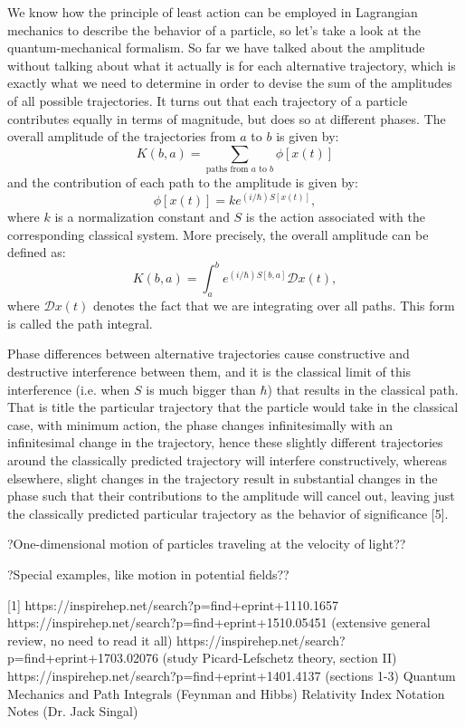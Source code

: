 \documentclass{emulateapj}
\begin{document}
We know how the principle of least action can be employed in Lagrangian mechanics to describe the behavior of a particle, so let's take a look at the quantum-mechanical formalism. So far we have talked about the amplitude without talking about what it actually is for each alternative trajectory, which is exactly what we need to determine in order to devise the sum of the amplitudes of all possible trajectories. It turns out that each trajectory of a particle contributes equally in terms of magnitude, but does so at different phases. The overall amplitude of the trajectories from $a$ to $b$ is given by:
\[ K(b,a) = \sum_{\text{paths from $a$ to $b$}} \phi [x(t)] \]
and the contribution of each path to the amplitude is given by:
\[ \phi [x(t)] = k e^{(i/\hbar)S[x(t)]}, \]
where $k$ is a normalization constant and $S$ is the action associated with the corresponding classical system. More precisely, the overall amplitude can be defined as:
\[ K(b,a) = \int_{a}^{b} e^{(i/\hbar)S[b, a]} \mathcal{D}x(t), \]
where $\mathcal{D}x(t)$ denotes the fact that we are integrating over all paths. This form is called the path integral.

Phase differences between alternative trajectories cause constructive and destructive interference between them, and it is the classical limit of this interference (i.e. when $S$ is much bigger than $\hbar$) that results in the classical path. That is title the particular trajectory that the particle would take in the classical case, with minimum action, the phase changes infinitesimally with an infinitesimal change in the trajectory, hence these slightly different trajectories around the classically predicted trajectory will interfere constructively, whereas elsewhere, slight changes in the trajectory result in substantial changes in the phase such that their contributions to the amplitude will cancel out, leaving just the classically predicted particular trajectory as the behavior of significance [5].

?One-dimensional motion of particles traveling at the velocity of light??

?Special examples, like motion in potential fields??


\begin{thebibliography}{}

[1] https://inspirehep.net/search?p=find+eprint+1110.1657 \newline
[2] https://inspirehep.net/search?p=find+eprint+1510.05451  (extensive general review, no need to read it all) \newline
[3] https://inspirehep.net/search?p=find+eprint+1703.02076   (study Picard-Lefschetz theory, section II) \newline
[4] https://inspirehep.net/search?p=find+eprint+1401.4137   (sections 1-3) \newline
[5] Quantum Mechanics and Path Integrals (Feynman and Hibbs) \newline
[6] Relativity Index Notation Notes (Dr. Jack Singal) \newline
[7] \newline
[8] \newline
\end{thebibliography}
\end{document}
